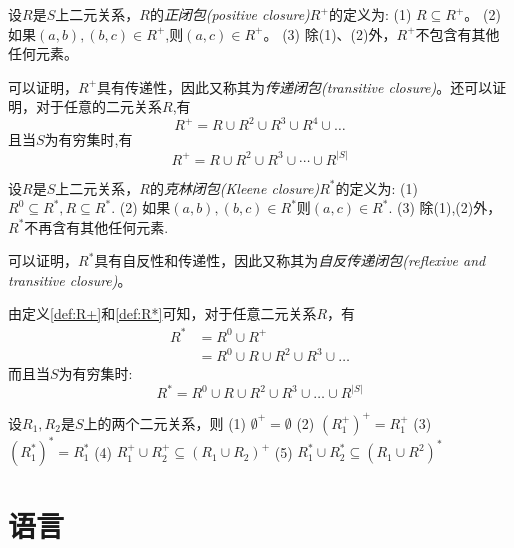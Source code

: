 \begin{definition}\label{def:R+}
	设$R$是$S$上二元关系，$R$的\emph{正闭包(positive closure)}$R^+$的定义为:
	\subitem(1) $R\subseteq R^{+}$。
	\subitem(2) 如果$(a,b),(b,c) \in R^{+}$,则$(a,c)\in R^{+}$。
	\subitem(3) 除(1)、(2)外，$R^{+}$不包含有其他任何元素。 
    
    可以证明，$R^+$具有传递性，因此又称其为\emph{传递闭包(transitive closure)}。还可以证明，对于任意的二元关系$R$,有
    $$R^{+} = R\cup R^2 \cup R^3 \cup R^4 \cup \dots$$
    且当$S$为有穷集时,有
    \[R^{+} = R\cup R^2 \cup R^3 \cup \cdots \cup R^{|S|} \]
\end{definition}

\begin{definition}\label{def:R*}
	设$R$是$S$上二元关系，$R$的\emph{克林闭包(Kleene closure)}$R^\ast$的定义为:
	\subitem(1) $R^0 \subseteq R^*,R\subseteq R^{\ast}$.
	\subitem(2) 如果$(a,b),(b,c)\in R^{\ast}$则$(a,c)\in R^{\ast}$.
	\subitem(3) 除(1),(2)外，$R^{\ast}$不再含有其他任何元素.
	
	可以证明，$R^\ast$具有自反性和传递性，因此又称其为\emph{自反传递闭包(reflexive and transitive closure)}。
\end{definition}

由定义\ref{def:R+}和\ref{def:R*}可知，对于任意二元关系$R$，有
\begin{align*}
	R^{\ast} &=R^{0}\cup R^{+} \\
	&=R^{0}\cup R\cup R^{2}\cup R^{3}\cup \dots
\end{align*}
而且当$S$为有穷集时:
\[R^{\ast} =R^{0}\cup R\cup R^{2}\cup R^{3}\cup \dots \cup R^{|S|} \]

设$R_1,R_2$是$S$上的两个二元关系，则
\subitem(1) $\emptyset^{+}=\emptyset$
\subitem(2) $(R_1^{+})^{+} = R_1^{+}$
\subitem(3) $(R_1^{\ast})^{\ast} = R_1^{\ast}$
\subitem(4) $R_1^{+}\cup R_2^{+} \subseteq (R_1 \cup R_2)^{+}$
\subitem(5) $R_1^{\ast}\cup R_2^{\ast} \subseteq (R_1\cup R^2)^{\ast}$	

\section{语言}
